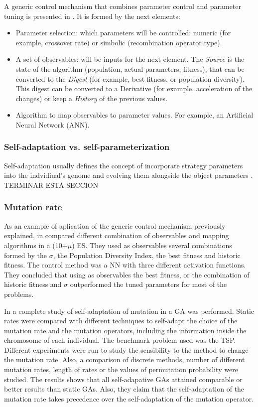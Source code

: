 A generic control mechanism that combines parameter control and parameter tuning is presented in \cite{GenericApproachKarafotias12}. It is formed by the next elements:
\begin{itemize}
\item Parameter selection: which parameters will be controlled: numeric (for example, crossover rate) or simbolic (recombination operator type).
\item A set of observables: will be inputs for the next element. The {\em Source} is the state of the algorithm (population, actual parameters, fitness), that can be converted to the {\em Digest} (for example, best fitness, or population diversity). This digest can be converted to a Derivative (for example, acceleration of the changes) or keep a {\em History} of the previous values.
\item Algorithm to map observables to parameter values. For example, an Artificial Neural Network (ANN).
\end{itemize}

\subsubsection{Self-adaptation vs. self-parameterization}

Self-adaptation usually defines the concept of incorporate strategy parameters into the indvidiual's genome and evolving them alongside the object parameters \cite{SelfAdaptationMeyer07}. TERMINAR ESTA SECCION



\subsubsection{Mutation rate}

As an example of aplication of the generic control mechanism previously explained, in \cite{GenericApproachKarafotias12} compared different combination of observables and mapping algorithms in a (10+$\mu$) ES. They used as observables several combinations formed by the $\sigma$, the Population Diversity Index, the best fitness and historic fitness. The control method was a NN with three different activation functions. They concluded that using as observables the best fitness, or the combination of historic fitness and $\sigma$ outperformed the tuned parameters for  most of the problems.

In \cite{MutationSerpell10} a complete study of self-adaptation of mutation in a GA was performed. Static rates were compared with different techniques to self-adapt the choice of the mutation rate and the mutation operators, including the information inside the chromosome of each individual. The benchmark problem used was the TSP. Different experiments were run to study the sensibility to the method to change the mutation rate. Also, a comparison of discrete methods, number of different mutation rates, length of rates or the values of permutation probability were studied. The results shows that all self-adapative GAs attained comparable or better results than static GAs. Also, they claim that the self-adaptation of the mutation rate takes precedence over the self-adaptation of the mutation operator.

